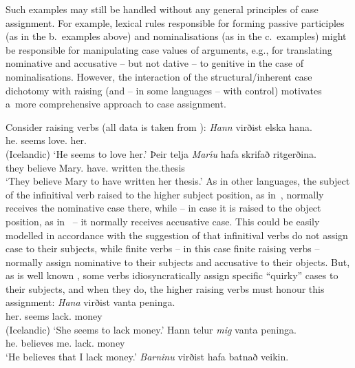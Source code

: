 \documentclass[output=paper,biblatex,babelshorthands,newtxmath,draftmode,colorlinks,citecolor=brown]{langscibook}
\begin{document}
Such examples may still be handled without any general principles of case assignment.  For example, lexical rules \citep[209–218]{ps} responsible for forming passive participles (as in the b.~examples above) and nominalisations (as in the c.~examples) might be responsible for manipulating case values of arguments, e.g., for translating nominative and accusative – but not dative – to genitive in the case of nominalisations.  However, the interaction of the structural/inherent case dichotomy with raising (and – in some languages – with control) motivates a~more comprehensive approach to case assignment.

Consider  raising verbs (all  data is taken from \citealt[304–305]{SKG92}):
\eal
\label{isl:nom}
\ex
\gll \emph{Hann} virðist elska hana. \\
     he.\NOM{} seems love.\INF{} her.\ACC{}\\\hfill(Icelandic)
\glt `He seems to love her.'
\ex
\gll Þeir telja \emph{Mar{\'\i}u} hafa skrifað ritgerðina. \\
     they believe Mary.\ACC{} have.\INF{} written the.thesis\\
\glt `They believe Mary to have written her thesis.'
\zl
As in other languages, the subject of the infinitival verb raised to the higher subject position, as in~, normally receives the nominative case there, while – in case it is raised to the object position, as in~ – it normally receives accusative case.  This could be easily modelled in accordance with the suggestion of \citet[30]{ps2} that infinitival verbs do not assign case to their subjects, while finite verbs – in this case finite raising verbs – normally assign nominative to their subjects and accusative to their objects.  But, as is well known \citep{Andrews82a-u,zae:mal:83,ZMT85a}, some  verbs idiosyncratically assign specific “quirky” cases to their subjects, and when they do, the higher raising verbs must honour this assignment:
\eal\label{isl:acc}
\ex
\gll \emph{Hana} virðist vanta peninga. \\
      her.\ACC{} seems lack.\INF{} money\\\hfill(Icelandic)
\glt `She seems to lack money.'
\ex
\gll Hann telur \emph{mig} vanta peninga. \\
      he.\NOM{} believes me.\ACC{} lack.\INF{} money\\
\glt `He believes that I lack money.'
\zl
\eal
\label{isl:dat}
\ex
\gll  \emph{Barninu} virðist hafa batnað veikin. \\
\end{document}
